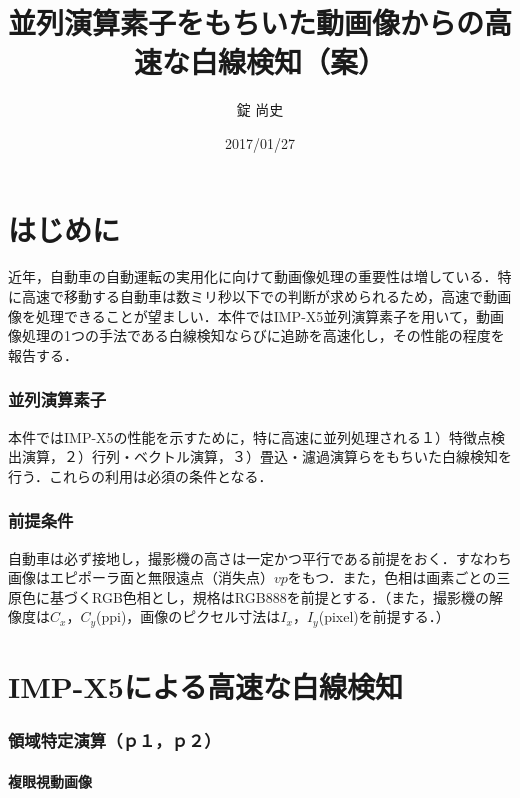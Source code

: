 \documentclass{jsarticle}
\title{並列演算素子をもちいた動画像からの高速な白線検知（案）}
\author{錠 尚史}
\date{2017/01/27}
\begin{document}
\maketitle


\part{はじめに}
\label{はじめに}

近年，自動車の自動運転の実用化に向けて動画像処理の重要性は増している．特に高速で移動する自動車は数ミリ秒以下での判断が求められるため，高速で動画像を処理できることが望ましい．本件ではIMP-X5並列演算素子を用いて，動画像処理の1つの手法である白線検知ならびに追跡を高速化し，その性能の程度を報告する．

\section{並列演算素子}
\label{並列演算素子}

本件ではIMP-X5の性能を示すために，特に高速に並列処理される１）特徴点検出演算，２）行列・ベクトル演算，３）畳込・濾過演算らをもちいた白線検知を行う．これらの利用は必須の条件となる．

\section{前提条件}
\label{前提条件}

自動車は必ず接地し，撮影機の高さは一定かつ平行である前提をおく．すなわち画像はエピポーラ面と無限遠点（消失点）$vp$をもつ．また，色相は画素ごとの三原色に基づくRGB色相とし，規格はRGB888を前提とする．（また，撮影機の解像度は$C_x$，$C_y$(ppi)，画像のピクセル寸法は$I_x$，$I_y$(pixel)を前提する．）

\part{IMP-X5による高速な白線検知}
\label{IMP-X5による高速な白線検知}

\section{領域特定演算（ｐ１，ｐ２）}
\label{領域特定演算（ｐ１，ｐ２）}

\subsection{複眼視動画像}
\label{複眼視動画像}
\end{document}
